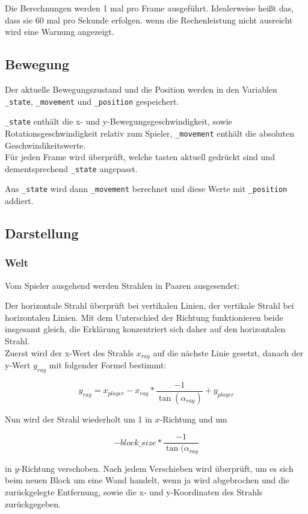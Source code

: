 \documentclass[a4paper,titlepage]{article}
\begin{document}
Die Berechnungen werden 1 mal pro Frame ausgeführt. Idealerweise heißt das, dass sie 60 mal pro Sekunde erfolgen. wenn die Rechenleistung nicht ausreicht wird eine Warnung angezeigt.

\subsection{Bewegung}

Der aktuelle Bewegungszustand und die Position werden in den Variablen \verb|_state|, \verb|_movement| und \verb|_position| gespeichert.

\verb|_state| enthält die x- und y-Bewegungsgeschwindigkeit, sowie Rotationsgeschwindigkeit relativ zum Spieler, \verb|_movement| enthält die absoluten Geschwindikeitswerte.\\

Für jeden Frame wird überprüft, welche tasten aktuell gedrückt sind und dementsprechend \verb|_state| angepasst.

Aus \verb|_state| wird dann \verb|_movement| berechnet und diese Werte mit \verb|_position| addiert.

\subsection{Darstellung}

\subsubsection*{Welt}

Vom Spieler ausgehend werden Strahlen in Paaren ausgesendet:

Der horizontale Strahl überprüft bei vertikalen Linien, der vertikale Strahl bei horizontalen Linien.
Mit dem Unterschied der Richtung funktionieren beide insgesamt gleich, die Erklärung konzentriert sich daher auf den horizontalen Strahl.\\

Zuerst wird der x-Wert des Strahls $x_{ray}$ auf die nächste Linie gesetzt, danach der y-Wert $y_{ray}$ mit folgender Formel bestimmt: 

$$y_{ray} = x_{player}-x_{ray}*\frac{-1}{\tan(\alpha_{ray})}+y_{player}$$

Nun wird der Strahl wiederholt um 1 in $x$-Richtung und um

$$-block\_size * \frac{-1}{\tan(\alpha_{ray}}$$

in $y$-Richtung verschoben. Nach jedem Verschieben wird überprüft, um es sich beim neuen Block um eine Wand handelt, wenn ja wird abgebrochen und die zurückgelegte Entfernung, sowie die x- und y-Koordinaten des Strahls zurückgegeben.\\
\end{document}
